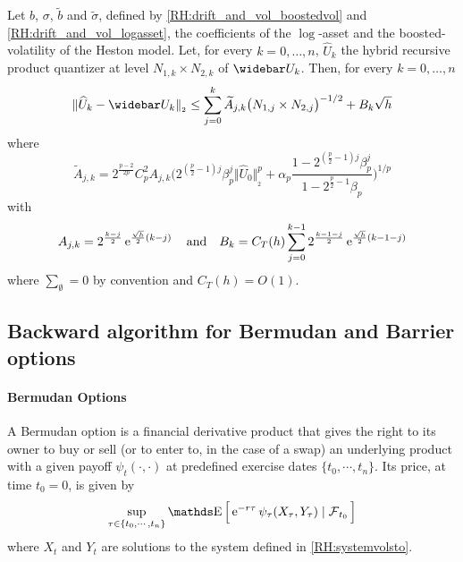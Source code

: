 \begin{proposition} \label{RH:prop:l2-error}
	Let $b$, $\sigma$, $\widetilde b$ and $\widetilde \sigma$, defined by \eqref{RH:drift_and_vol_boostedvol} and \eqref{RH:drift_and_vol_logasset}, the coefficients of the $\log$-asset and the boosted-volatility of the Heston model. Let, for every $k=0, \dots, n$, $\widehat U_k$ the hybrid recursive product quantizer at level $N_{1,k} \times N_{2,k}$ of $\widebar U_k$. Then, for every $k=0, \dots, n$
	\begin{equation}
		\begin{aligned}
			\Vert \widehat U_k - \widebar U_k \Vert_{_2}
			 & \leq \sum_{j=0}^k \widetilde A_{j,k} \big( N_{1,j} \times N_{2,j} \big)^{-1/2} + B_{k} \sqrt{h} \\
		\end{aligned}
	\end{equation}
	where
	\begin{equation}
		\widetilde A_{j,k} = 2^{\frac{p-2}{2p}} C_p^2 A_{j,k} \bigg( 2^{(\frac{p}{2}-1 )j} \beta_{p}^j \Vert \widehat U_0 \Vert_{_2}^p + \alpha_{p} \frac{1 - 2^{(\frac{p}{2}-1 )j} \beta_{p}^j }{1 - 2^{\frac{p}{2}-1} \beta_{p} } \bigg)^{1/p}
	\end{equation}
	with
	\begin{equation}
		A_{j,k} = 2^{\frac{k-j}{2}} \operatorname{e}^{\frac{\sqrt{h}}{2}(k-j)} \quad \mbox{and} \quad B_k = C_{T} (h) \sum_{j=0}^{k-1} 2^{\frac{k-1-j}{2}} \operatorname{e}^{\frac{\sqrt{h}}{2}(k-1-j)}
	\end{equation}
	where $\sum_{\emptyset} = 0$ by convention and $C_T(h) = O(1)$.
\end{proposition}



\subsection{Backward algorithm for Bermudan and Barrier options}

\paragraph{Bermudan Options}

A Bermudan option is a financial derivative product that gives the right to its owner to buy or sell (or to enter to, in the case of a swap) an underlying product with a given payoff $\psi_t(\cdot, \cdot)$ at predefined exercise dates $\{t_0, \cdots, t_n\}$. Its price, at time $t_0=0$, is given by
\begin{equation*}
	\sup_{\tau \in \{ t_0, \cdots, t_n \}} \E \Big[ \e^{ - r \tau } \psi_{\tau} ( X_{\tau}, Y_{\tau} ) \mid \F_{t_0} \Big]
\end{equation*}
where $X_t$ and $Y_t$ are solutions to the system defined in \eqref{RH:systemvolsto}.

